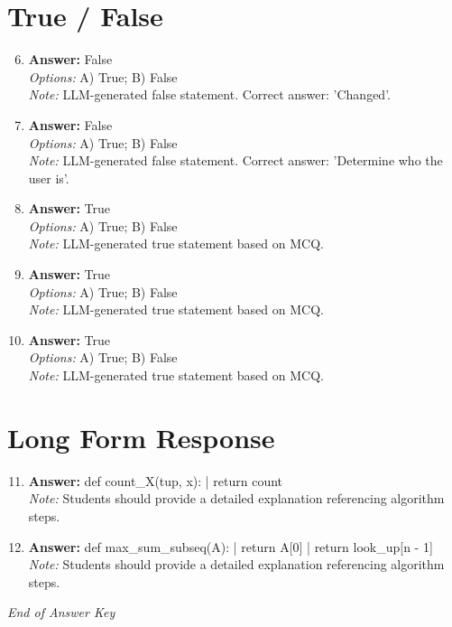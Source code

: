 \documentclass[12pt]{article}
\begin{document}
\section*{True / False}
\begin{enumerate}[label=\arabic*.]
\setcounter{enumi}{5}
\item \textbf{Answer:} False
\\ \textit{Options:} A) True; B) False
\\ \textit{Note:} LLM-generated false statement. Correct answer: 'Changed'.
\item \textbf{Answer:} False
\\ \textit{Options:} A) True; B) False
\\ \textit{Note:} LLM-generated false statement. Correct answer: 'Determine who the user is'.
\item \textbf{Answer:} True
\\ \textit{Options:} A) True; B) False
\\ \textit{Note:} LLM-generated true statement based on MCQ.
\item \textbf{Answer:} True
\\ \textit{Options:} A) True; B) False
\\ \textit{Note:} LLM-generated true statement based on MCQ.
\item \textbf{Answer:} True
\\ \textit{Options:} A) True; B) False
\\ \textit{Note:} LLM-generated true statement based on MCQ.
\end{enumerate}

\section*{Long Form Response}
\begin{enumerate}[label=\arabic*.]
\setcounter{enumi}{10}
\item \textbf{Answer:} def count\_X(tup, x): | return count
\\ \textit{Note:} Students should provide a detailed explanation referencing algorithm steps.
\item \textbf{Answer:} def max\_sum\_subseq(A): | return A[0] | return look\_up[n - 1]
\\ \textit{Note:} Students should provide a detailed explanation referencing algorithm steps.
\end{enumerate}

\vfill
\noindent\textit{End of Answer Key}
\end{document}
